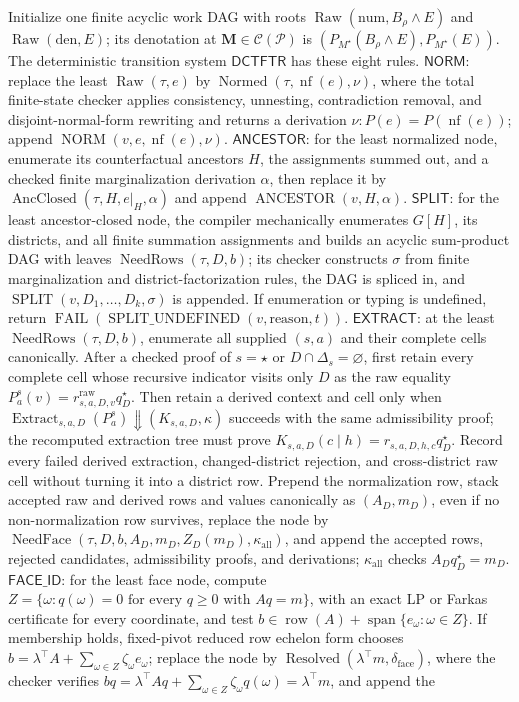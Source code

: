 Initialize one finite acyclic work DAG with roots \(\operatorname{Raw}(\mathrm{num},B_\rho\wedge E)\) and \(\operatorname{Raw}(\mathrm{den},E)\); its denotation at \(\mathbf M\in\mathcal C(\mathcal P)\) is \((P_{M^\star}(B_\rho\wedge E),P_{M^\star}(E))\). The deterministic transition system \(\mathsf{DCTFTR}\) has these eight rules. \(\mathsf{NORM}\): replace the least \(\operatorname{Raw}(\tau,e)\) by \(\operatorname{Normed}(\tau,\operatorname{nf}(e),\nu)\), where the total finite-state checker applies consistency, unnesting, contradiction removal, and disjoint-normal-form rewriting and returns a derivation \(\nu:P(e)=P(\operatorname{nf}(e))\); append \(\operatorname{NORM}(v,e,\operatorname{nf}(e),\nu)\). \(\mathsf{ANCESTOR}\): for the least normalized node, enumerate its counterfactual ancestors \(H\), the assignments summed out, and a checked finite marginalization derivation \(\alpha\), then replace it by \(\operatorname{AncClosed}(\tau,H,e|_H,\alpha)\) and append \(\operatorname{ANCESTOR}(v,H,\alpha)\). \(\mathsf{SPLIT}\): for the least ancestor-closed node, the compiler mechanically enumerates \(G[H]\), its districts, and all finite summation assignments and builds an acyclic sum-product DAG with leaves \(\operatorname{NeedRows}(\tau,D,b)\); its checker constructs \(\sigma\) from finite marginalization and district-factorization rules, the DAG is spliced in, and \(\operatorname{SPLIT}(v,D_1,\ldots,D_k,\sigma)\) is appended. If enumeration or typing is undefined, return \(\operatorname{FAIL}(\operatorname{SPLIT\_UNDEFINED}(v,\mathrm{reason},t))\). \(\mathsf{EXTRACT}\): at the least \(\operatorname{NeedRows}(\tau,D,b)\), enumerate all supplied \((s,a)\) and their complete cells canonically.  After a checked proof of \(s=\star\) or \(D\cap\Delta_s=\varnothing\), first retain every complete cell whose recursive indicator visits only \(D\) as the raw equality \(P_a^s(v)=r^{\mathrm{raw}}_{s,a,D,v}q_D^\star\).  Then retain a derived context and cell only when \(\operatorname{Extract}_{s,a,D}(P_a^s)\Downarrow(K_{s,a,D},\kappa)\) succeeds with the same admissibility proof; the recomputed extraction tree must prove \(K_{s,a,D}(c\mid h)=r_{s,a,D,h,c}q_D^\star\). Record every failed derived extraction, changed-district rejection, and cross-district raw cell without turning it into a district row. Prepend the normalization row, stack accepted raw and derived rows and values canonically as \((A_D,m_D)\), even if no non-normalization row survives, replace the node by \(\operatorname{NeedFace}(\tau,D,b,A_D,m_D,Z_D(m_D),\kappa_{\mathrm{all}})\), and append the accepted rows, rejected candidates, admissibility proofs, and derivations; \(\kappa_{\mathrm{all}}\) checks \(A_Dq_D^\star=m_D\). \(\mathsf{FACE\_ID}\): for the least face node, compute \(Z=\{\omega:q(\omega)=0\text{ for every }q\ge0\text{ with }Aq=m\}\), with an exact LP or Farkas certificate for every coordinate, and test \(b\in\operatorname{row}(A)+\operatorname{span}\{e_\omega:\omega\in Z\}\). If membership holds, fixed-pivot reduced row echelon form chooses \(b=\lambda^\top A+\sum_{\omega\in Z}\zeta_\omega e_\omega\); replace the node by \(\operatorname{Resolved}(\lambda^\top m,\delta_{\mathrm{face}})\), where the checker verifies \(bq=\lambda^\top Aq+\sum_{\omega\in Z}\zeta_\omega q(\omega)=\lambda^\top m\), and append the 